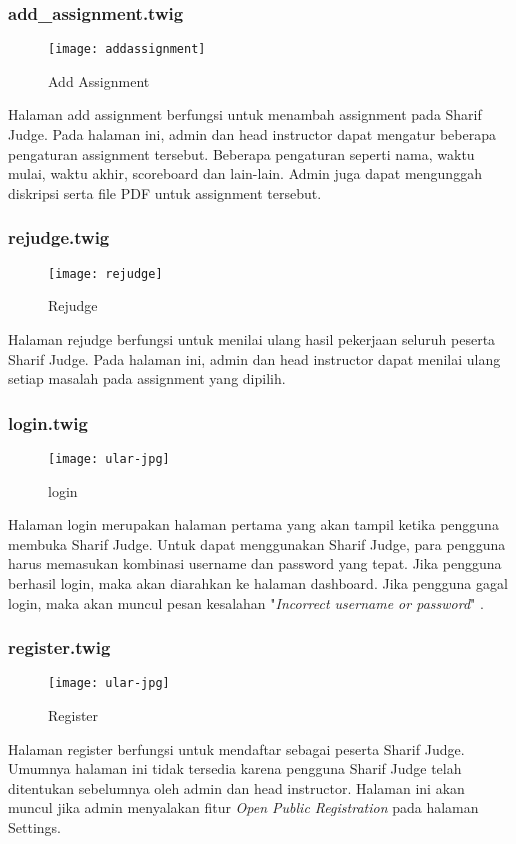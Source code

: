 \subsubsection{add\_assignment.twig}
\begin{figure}[H]
	\centering  
	\texttt{[image: addassignment]}  
	\caption[Add Assignment]{Add Assignment} 
	\label{fig:addassignment} 
\end{figure} 
Halaman add assignment berfungsi untuk menambah assignment pada Sharif Judge. Pada halaman ini, admin dan head instructor dapat mengatur beberapa pengaturan assignment tersebut. Beberapa pengaturan seperti nama, waktu mulai, waktu akhir, scoreboard dan lain-lain. Admin juga dapat mengunggah diskripsi serta file PDF untuk assignment tersebut.

\subsubsection{rejudge.twig}
\begin{figure}[H]
	\centering  
	\texttt{[image: rejudge]}  
	\caption[Rejudge]{Rejudge} 
	\label{fig:rejudge} 
\end{figure} 
Halaman rejudge berfungsi untuk menilai ulang hasil pekerjaan seluruh peserta Sharif Judge. Pada halaman ini, admin dan head instructor dapat menilai ulang setiap masalah pada assignment yang dipilih.

\subsubsection{login.twig}
\begin{figure}[H]
	\centering  
	\texttt{[image: ular-jpg]}  
	\caption[Login]{login} 
	\label{fig:oldlogin} 
\end{figure} 
Halaman login merupakan halaman pertama yang akan tampil ketika pengguna membuka Sharif Judge. Untuk dapat menggunakan Sharif Judge, para pengguna harus memasukan kombinasi username dan password yang tepat. Jika pengguna berhasil login, maka akan diarahkan ke halaman dashboard. Jika pengguna gagal login, maka akan muncul pesan kesalahan "\textit{Incorrect username or password}" .

\subsubsection{register.twig}
\begin{figure}[H]
	\centering  
	\texttt{[image: ular-jpg]}  
	\caption[Register]{Register} 
	\label{fig:register} 
\end{figure} 
Halaman register berfungsi untuk mendaftar sebagai peserta Sharif Judge. Umumnya halaman ini tidak tersedia karena pengguna Sharif Judge telah ditentukan sebelumnya oleh admin dan head instructor. Halaman ini akan muncul jika admin menyalakan fitur \textit{Open Public Registration} pada halaman Settings.

